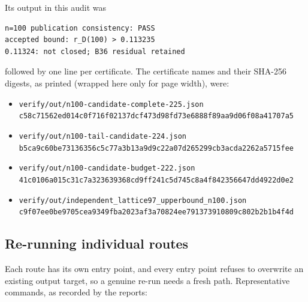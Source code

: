 Its output in this audit was
\begin{verbatim}
n=100 publication consistency: PASS
accepted bound: r_D(100) > 0.113235
0.11324: not closed; B36 residual retained
\end{verbatim}
followed by one line per certificate. The certificate names and their SHA-256 digests, as printed
(wrapped here only for page width), were:
\begin{itemize}[leftmargin=1.4em,itemsep=2pt]
\item {\footnotesize\texttt{verify/\allowbreak{}out/\allowbreak{}n100-\allowbreak{}candidate-\allowbreak{}complete-\allowbreak{}225.json}}\\
{\footnotesize\texttt{c58c71562ed014c0f716f02137dcf473d98fd73e6888f89aa9d06f08a41707a5}}
\item {\footnotesize\texttt{verify/\allowbreak{}out/\allowbreak{}n100-\allowbreak{}tail-\allowbreak{}candidate-\allowbreak{}224.json}}\\
{\footnotesize\texttt{b5ca9c60be73136356c5c77a3b13a9d9c22a07d265299cb3acda2262a5715fee}}
\item {\footnotesize\texttt{verify/\allowbreak{}out/\allowbreak{}n100-\allowbreak{}candidate-\allowbreak{}budget-\allowbreak{}222.json}}\\
{\footnotesize\texttt{41c0106a015c31c7a323639368cd9ff241c5d745c8a4f842356647dd4922d0e2}}
\item {\footnotesize\texttt{verify/\allowbreak{}out/\allowbreak{}independent\_\allowbreak{}lattice97\_\allowbreak{}upperbound\_\allowbreak{}n100.json}}\\
{\footnotesize\texttt{c9f07ee0be9705cea9349fba2023af3a70824ee791373910809c802b2b1b4f4d}}
\end{itemize}

\subsection{Re-running individual routes}

Each route has its own entry point, and every entry point refuses to overwrite an existing output
target, so a genuine re-run needs a fresh path. Representative commands, as recorded by the reports:

